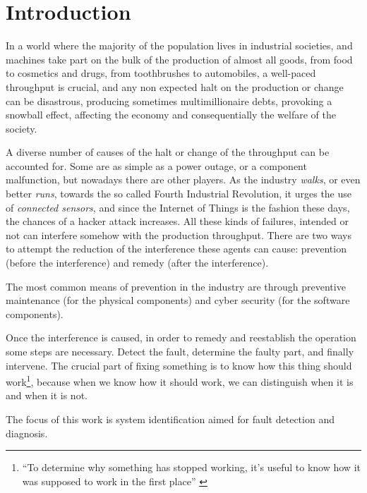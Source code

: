 
\chapter{Introduction}
In a world where the majority of the population lives in industrial societies,
and machines take part on the bulk of the production of almost all goods, from
food to cosmetics and drugs, from toothbrushes to automobiles, 
a well-paced throughput is crucial, and any non expected halt on the
production or change can be disastrous, producing sometimes multimillionaire debts,
provoking a snowball effect, affecting the economy and consequentially the welfare of the society.

A diverse number of causes of the halt or change of the throughput can be
accounted for. Some are as simple as a power outage, or a component malfunction,
but nowadays there are other players. As the industry \textsl{walks}, or even
better \textsl{runs}, towards the so called Fourth Industrial Revolution, 
it urges the use of \textit{connected sensors}, and since the Internet of
Things is the fashion these days, the chances of a hacker attack increases. All
these kinds of failures, intended or not can interfere somehow with the
production throughput. There are two ways to attempt the reduction of the interference these agents can
cause: prevention (before the interference) and remedy (after the interference).

The most common means of prevention in the industry are through preventive
maintenance (for the physical components) and cyber security (for the software
components).

Once the interference is caused, in order to remedy and reestablish
the operation some steps are necessary. Detect the fault, determine the faulty
part, and finally intervene.
The crucial part of fixing something is to know how this thing should
work\footnote{``To determine why something has stopped working, it's useful to
  know how it was supposed to work in the first place'' \cite{davis1988model}},
because when we know how it should work, we can distinguish when it is and when
it is not.

The focus of this work is system identification aimed for fault
detection and diagnosis.


